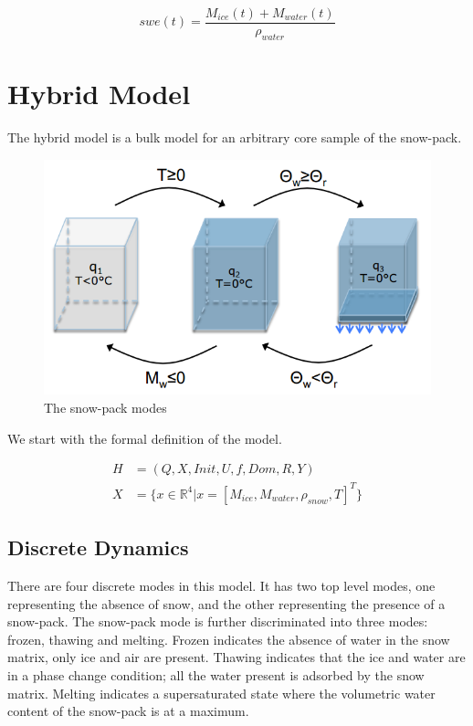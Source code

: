 \documentclass{article}
\begin{document}
\begin{equation}
swe(t) = \frac{M_{ice}(t) + M_{water}(t)}{\rho_{water}} \label{eqn:swe}
\end{equation}


\section{Hybrid Model}

The hybrid model is a bulk model for an arbitrary core 
sample of the snow-pack.

\begin{figure}[h!]
\centering
\includegraphics[scale=0.7]{discrete_modes.png}
\caption{The snow-pack modes}
\label{fig:snowpack-modes}
\end{figure}

We start with the formal definition of the model.

\begin{align}
H &= (Q, X, Init, U, f, Dom, R, Y) \\
X &= \{x \in \mathbb{R}^4 \big| x = \left[ M_{ice}, M_{water}, \rho_{snow}, T \right]^T\}
\end{align}

\subsection{Discrete Dynamics}

There are four discrete modes in this model.
It has two top level modes, one representing the absence
of snow, and the other representing the presence of a snow-pack.
The snow-pack mode is further discriminated into three modes:
frozen, thawing and melting.
Frozen indicates the absence of water in the snow matrix,
only ice and air are present.
Thawing indicates that the ice and water are in a phase change condition;
all the water present is adsorbed by the snow matrix.
Melting indicates a supersaturated state where the 
volumetric water content of the snow-pack is at a maximum.
\end{document}
